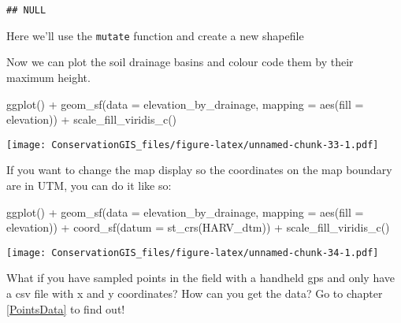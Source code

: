 \documentclass[
]{book}
\newenvironment{Shaded}{\begin{snugshade}}{\end{snugshade}}
\newcommand{\AttributeTok}[1]{\textcolor[rgb]{0.77,0.63,0.00}{#1}}
\newcommand{\FunctionTok}[1]{\textcolor[rgb]{0.00,0.00,0.00}{#1}}
\newcommand{\NormalTok}[1]{#1}
\newcommand{\OtherTok}[1]{\textcolor[rgb]{0.56,0.35,0.01}{#1}}
\newcommand{\SpecialCharTok}[1]{\textcolor[rgb]{0.00,0.00,0.00}{#1}}
\begin{document}
\begin{verbatim}
## NULL
\end{verbatim}

Here we'll use the \texttt{mutate} function and create a new shapefile

\begin{Shaded}
\end{Shaded}

Now we can plot the soil drainage basins and colour code them by their maximum height.

\begin{Shaded}
\begin{Highlighting}[]
\FunctionTok{ggplot}\NormalTok{() }\SpecialCharTok{+}
  \FunctionTok{geom\_sf}\NormalTok{(}\AttributeTok{data =}\NormalTok{ elevation\_by\_drainage, }\AttributeTok{mapping =} \FunctionTok{aes}\NormalTok{(}\AttributeTok{fill =}\NormalTok{ elevation)) }\SpecialCharTok{+}
  \FunctionTok{scale\_fill\_viridis\_c}\NormalTok{()}
\end{Highlighting}
\end{Shaded}

\texttt{[image: ConservationGIS\_files/figure-latex/unnamed-chunk-33-1.pdf]}

If you want to change the map display so the coordinates on the map boundary are in UTM, you can do it like so:

\begin{Shaded}
\begin{Highlighting}[]
\FunctionTok{ggplot}\NormalTok{() }\SpecialCharTok{+}
  \FunctionTok{geom\_sf}\NormalTok{(}\AttributeTok{data =}\NormalTok{ elevation\_by\_drainage, }\AttributeTok{mapping =} \FunctionTok{aes}\NormalTok{(}\AttributeTok{fill =}\NormalTok{ elevation)) }\SpecialCharTok{+}
  \FunctionTok{coord\_sf}\NormalTok{(}\AttributeTok{datum =} \FunctionTok{st\_crs}\NormalTok{(HARV\_dtm)) }\SpecialCharTok{+} 
  \FunctionTok{scale\_fill\_viridis\_c}\NormalTok{()}
\end{Highlighting}
\end{Shaded}

\texttt{[image: ConservationGIS\_files/figure-latex/unnamed-chunk-34-1.pdf]}

What if you have sampled points in the field with a handheld gps and only have a csv file with x and y coordinates? How can you get the data? Go to chapter \ref{PointsData} to find out!
\end{document}
